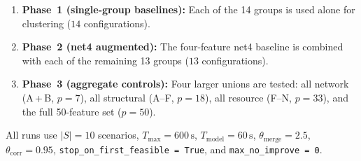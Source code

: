 \begin{enumerate}
  \item \textbf{Phase~1 (single-group baselines):}
        Each of the 14 groups is used alone for clustering
        ($14$ configurations).
  \item \textbf{Phase~2 (net4 augmented):}
        The four-feature net4 baseline is combined with each
        of the remaining 13 groups
        ($13$ configurations).
  \item \textbf{Phase~3 (aggregate controls):}
        Four larger unions are tested:
        all network (A\,+\,B, $p{=}7$),
        all structural (A--F, $p{=}18$),
        all resource (F--N, $p{=}33$),
        and the full 50-feature set ($p{=}50$).
\end{enumerate}
\noindent
All runs use $|S|=10$ scenarios,
$T_{\max}=600\,\text{s}$,
$T_{\mathrm{model}}=60\,\text{s}$,
$\theta_{\mathrm{merge}}=2.5$,
$\theta_{\mathrm{corr}}=0.95$,
\texttt{stop\_on\_first\_feasible\,=\,True},
and \texttt{max\_no\_improve\,=\,0}.

